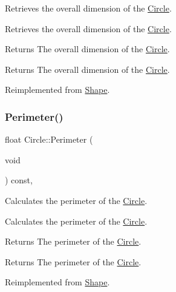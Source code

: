 Retrieves the overall dimension of the \mbox{\hyperlink{class_circle}{Circle}}. 

Retrieves the overall dimension of the \mbox{\hyperlink{class_circle}{Circle}}.

\begin{DoxyReturn}{Returns}
The overall dimension of the \mbox{\hyperlink{class_circle}{Circle}}.
\end{DoxyReturn}


\begin{DoxyReturn}{Returns}
The overall dimension of the \mbox{\hyperlink{class_circle}{Circle}}. 
\end{DoxyReturn}


Reimplemented from \mbox{\hyperlink{class_shape_a60aea90f45ea0f6d60cd749918728e16}{Shape}}.

\mbox{\label{class_circle_acbb15d0cc28936ddd847802d81ba95c7}} 
\subsubsection{\texorpdfstring{Perimeter()}{Perimeter()}}
{\footnotesize\ttfamily float Circle\+::\+Perimeter (\begin{DoxyParamCaption}\item[{void}]{ }\end{DoxyParamCaption}) const\hspace{0.3cm}{\ttfamily [override]}, {\ttfamily [virtual]}}



Calculates the perimeter of the \mbox{\hyperlink{class_circle}{Circle}}. 

Calculates the perimeter of the \mbox{\hyperlink{class_circle}{Circle}}.

\begin{DoxyReturn}{Returns}
The perimeter of the \mbox{\hyperlink{class_circle}{Circle}}.
\end{DoxyReturn}


\begin{DoxyReturn}{Returns}
The perimeter of the \mbox{\hyperlink{class_circle}{Circle}}. 
\end{DoxyReturn}


Reimplemented from \mbox{\hyperlink{class_shape_a27f450f44fc4f9a444600b5df6754c5f}{Shape}}.

\mbox{\label{class_circle_a662e7217755cd13ad6669c52514f2d97}} 
